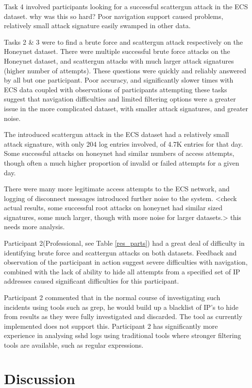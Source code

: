 Task 4 involved participants looking for a successful scattergun attack in the ECS dataset. why was this so hard? Poor navigation support caused problems, relatively small attack signature easily swamped in other data.

Tasks 2 \& 3 were to find a brute force and scattergun attack respectively on the Honeynet dataset.
There were multiple successful brute force attacks on the Honeynet dataset, and scattergun attacks with much larger attack signatures (higher number of attempts). These questions were quickly and reliably answered by all but one participant. Poor accuracy, and significantly slower times with ECS data coupled with observations of participants attempting these tasks suggest that navigation difficulties and limited filtering options were a greater issue in the more complicated dataset, with smaller attack signatures, and greater noise. 

The introduced scattergun attack in the ECS dataset had a relatively small attack signature, with only 204 log entries involved, of 4.7K entries for that day. Some successful attacks on honeynet had similar numbers of access attempts, though often a much higher proportion of invalid or failed attempts for a given day. 

There were many more legitimate access attempts to the ECS network, and logging of disconnect messages introduced further noise to the system. 
<check actual results, some successful root attacks on honeynet had similar sized signatures, some much larger, though with more noise for larger datasets.>
this needs more analysis.

Participant 2(Professional, see Table \ref{res_parts}) had a great deal of difficulty in identifying brute force and scattergun attacks on both datasets. Feedback and observation of the participant in action suggest severe difficulties with navigation, combined with the lack of ability to hide all attempts from a specified set of IP addresses caused significant difficulties for this participant.

Participant 2 commented that in the normal course of investigating such incidents using tools such as grep, he would build up a blacklist of IP's to hide from results as they were fully investigated and discarded.
The tool as currently implemented does not support this. Participant 2 has significantly more experience in analysing sshd logs using traditional tools where stronger filtering tools are available, such as regular expressions. 

\section{Discussion} 

